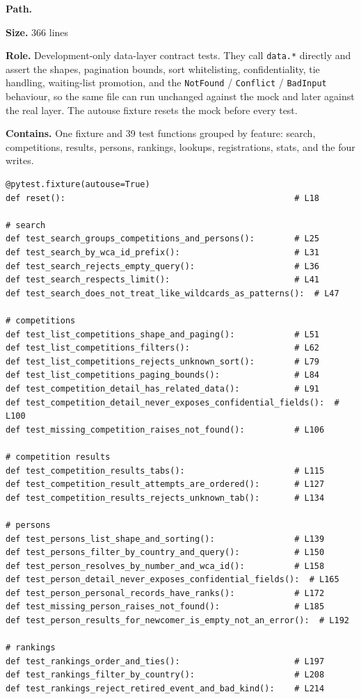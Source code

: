 \documentclass[11pt,a4paper]{article}
\newcommand{\filepath}[1]{\texttt{\detokenize{#1}}}
\newcommand{\role}[1]{\par\smallskip\noindent\textbf{Role.} #1\par}
\newcommand{\filesize}[1]{\par\smallskip\noindent\textbf{Size.} #1 lines\par}
\newcommand{\contents}[1]{\par\smallskip\noindent\textbf{Contains.} #1\par\smallskip}
\begin{document}
\noindent\textbf{Path.} \filepath{src/tests/test\_contract.py}
\filesize{366}
\role{Development-only data-layer contract tests. They call \texttt{data.*}
directly and assert the shapes, pagination bounds, sort whitelisting,
confidentiality, tie handling, waiting-list promotion, and the
\texttt{NotFound} / \texttt{Conflict} / \texttt{BadInput} behaviour, so the
same file can run unchanged against the mock and later against the real layer.
The autouse fixture resets the mock before every test.}
\contents{One fixture and 39 test functions grouped by feature: search,
competitions, results, persons, rankings, lookups, registrations, stats, and
the four writes.}

\begin{lstlisting}
@pytest.fixture(autouse=True)
def reset():                                              # L18

# search
def test_search_groups_competitions_and_persons():        # L25
def test_search_by_wca_id_prefix():                       # L31
def test_search_rejects_empty_query():                    # L36
def test_search_respects_limit():                         # L41
def test_search_does_not_treat_like_wildcards_as_patterns():  # L47

# competitions
def test_list_competitions_shape_and_paging():            # L51
def test_list_competitions_filters():                     # L62
def test_list_competitions_rejects_unknown_sort():        # L79
def test_list_competitions_paging_bounds():               # L84
def test_competition_detail_has_related_data():           # L91
def test_competition_detail_never_exposes_confidential_fields():  # L100
def test_missing_competition_raises_not_found():          # L106

# competition results
def test_competition_results_tabs():                      # L115
def test_competition_result_attempts_are_ordered():       # L127
def test_competition_results_rejects_unknown_tab():       # L134

# persons
def test_persons_list_shape_and_sorting():                # L139
def test_persons_filter_by_country_and_query():           # L150
def test_person_resolves_by_number_and_wca_id():          # L158
def test_person_detail_never_exposes_confidential_fields():  # L165
def test_person_personal_records_have_ranks():            # L172
def test_missing_person_raises_not_found():               # L185
def test_person_results_for_newcomer_is_empty_not_an_error():  # L192

# rankings
def test_rankings_order_and_ties():                       # L197
def test_rankings_filter_by_country():                    # L208
def test_rankings_reject_retired_event_and_bad_kind():    # L214


\end{lstlisting}
\end{document}
